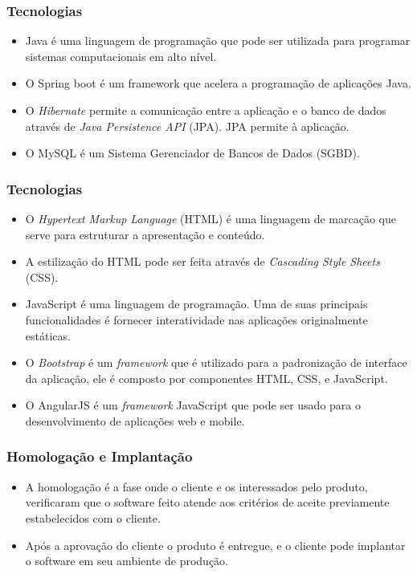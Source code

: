 \documentclass{beamer}
\begin{document}
	\begin{frame}\frametitle{Tecnologias}
		\begin{itemize}
			\item Java é uma linguagem de programação que pode ser utilizada para programar sistemas computacionais em alto nível.
			\item O Spring boot é um framework que acelera a programação de aplicações Java.
			\item O \textit{Hibernate} permite a comunicação entre a aplicação e o banco de dados através de \textit{Java Persistence API} (JPA). JPA permite à aplicação.
			\item O MySQL é um Sistema Gerenciador de Bancos de Dados (SGBD).
		\end{itemize}
	\end{frame}

	\begin{frame}\frametitle{Tecnologias}
		\begin{itemize}
			\item O \textit{Hypertext Markup Language} (HTML) é uma linguagem de marcação que serve para estruturar a apresentação e conteúdo.
			\item A estilização do HTML pode ser feita através de \textit{Cascading Style Sheets} (CSS).
			\item JavaScript é uma linguagem de programação. Uma de suas principais funcionalidades é fornecer interatividade nas aplicações originalmente estáticas.
			\item O \textit{Bootstrap} é um \textit{framework} que é utilizado para a padronização de interface da aplicação, ele é composto por componentes HTML, CSS, e JavaScript.
			\item O AngularJS é um \textit{framework} JavaScript que pode ser usado para o desenvolvimento de aplicações web e mobile.
		\end{itemize}
	\end{frame}

	\begin{frame}\frametitle{Homologação e Implantação}
		\begin{itemize}
		\item A homologação é a fase onde o cliente e os interessados pelo produto, verificaram que o software feito atende aos critérios de aceite previamente estabelecidos com o cliente.
		\item Após a aprovação do cliente o produto é entregue, e o cliente pode implantar o software em seu ambiente de produção.
		\end{itemize}
	\end{frame}
\end{document}
